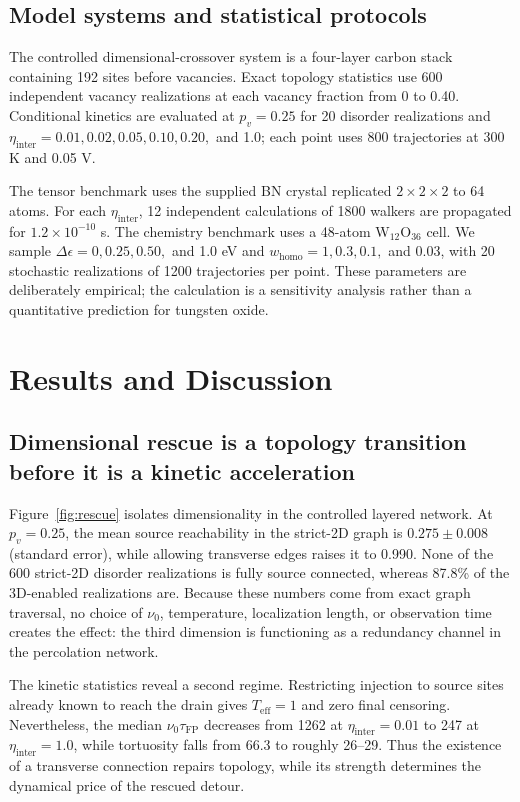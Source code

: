 \documentclass[aps,prmaterials,reprint,amsmath,amssymb,superscriptaddress,longbibliography]{revtex4-2}
\newcommand{\Teff}{T_{\mathrm{eff}}}
\newcommand{\taufp}{\tau_{\mathrm{FP}}}
\newcommand{\etaperp}{\eta_{\mathrm{inter}}}
\begin{document}
\subsection{Model systems and statistical protocols}
The controlled dimensional-crossover system is a four-layer carbon stack containing 192 sites before vacancies. Exact topology statistics use 600 independent vacancy realizations at each vacancy fraction from 0 to 0.40. Conditional kinetics are evaluated at $p_v=0.25$ for 20 disorder realizations and $\etaperp=0.01,0.02,0.05,0.10,0.20,$ and 1.0; each point uses 800 trajectories at 300 K and 0.05 V.

The tensor benchmark uses the supplied BN crystal replicated $2\times2\times2$ to 64 atoms. For each $\etaperp$, 12 independent calculations of 1800 walkers are propagated for $1.2\times10^{-10}$ s. The chemistry benchmark uses a 48-atom W$_{12}$O$_{36}$ cell. We sample $\Delta\epsilon=0,0.25,0.50,$ and 1.0 eV and $w_{\mathrm{homo}}=1,0.3,0.1,$ and 0.03, with 20 stochastic realizations of 1200 trajectories per point. These parameters are deliberately empirical; the calculation is a sensitivity analysis rather than a quantitative prediction for tungsten oxide.

\section{Results and Discussion}
\subsection{Dimensional rescue is a topology transition before it is a kinetic acceleration}
Figure~\ref{fig:rescue} isolates dimensionality in the controlled layered network. At $p_v=0.25$, the mean source reachability in the strict-2D graph is $0.275\pm0.008$ (standard error), while allowing transverse edges raises it to 0.990. None of the 600 strict-2D disorder realizations is fully source connected, whereas 87.8\% of the 3D-enabled realizations are. Because these numbers come from exact graph traversal, no choice of $\nu_0$, temperature, localization length, or observation time creates the effect: the third dimension is functioning as a redundancy channel in the percolation network.

The kinetic statistics reveal a second regime. Restricting injection to source sites already known to reach the drain gives $\Teff=1$ and zero final censoring. Nevertheless, the median $\nu_0\taufp$ decreases from 1262 at $\etaperp=0.01$ to 247 at $\etaperp=1.0$, while tortuosity falls from 66.3 to roughly 26--29. Thus the existence of a transverse connection repairs topology, while its strength determines the dynamical price of the rescued detour.
\end{document}
